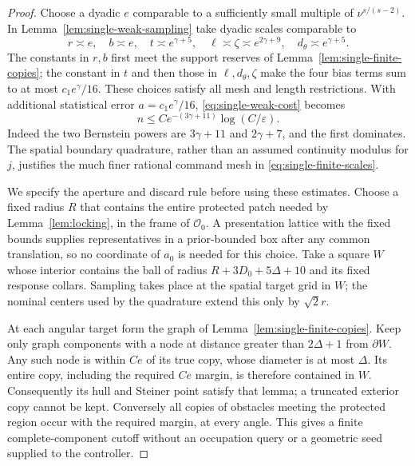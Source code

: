 \begin{proof}
Choose a dyadic $e$ comparable to a sufficiently small multiple of
$\nu^{s/(s-2)}$.  In Lemma~\ref{lem:single-weak-sampling} take dyadic
scales comparable to
\begin{equation}\label{eq:single-finite-scales}
 r\asymp e,\quad b\asymp e,\quad
 t\asymp e^{\gamma+5},\quad
 \ell\asymp\zeta\asymp e^{2\gamma+9},\quad
 d_\theta\asymp e^{\gamma+5}.
\end{equation}
The constants in $r,b$ first meet the support reserves of
Lemma~\ref{lem:single-finite-copies}; the constant in $t$ and then
those in $\ell,d_\theta,\zeta$ make the four bias terms sum to at
most $c_1e^\gamma/16$.  These choices satisfy all mesh and length
restrictions.  With additional statistical error
$a=c_1e^\gamma/16$, \eqref{eq:single-weak-cost} becomes
\begin{equation}\label{eq:single-per-target-count}
                  n\le C e^{-(3\gamma+11)}
                                   \log(C/\varepsilon).
\end{equation}
Indeed the two Bernstein powers are $3\gamma+11$ and $2\gamma+7$,
and the first dominates.  The spatial boundary quadrature, rather
than an assumed continuity modulus for $j$, justifies the much finer
rational command mesh in \eqref{eq:single-finite-scales}.

We specify the aperture and discard rule before using these estimates.
Choose a fixed radius $R$ that contains the entire protected patch
needed by Lemma~\ref{lem:locking}, in the frame of $\mathcal O_0$.
A presentation lattice with the fixed bounds supplies representatives
in a prior-bounded box after any common translation, so no coordinate
of $a_0$ is needed for this choice.  Take a square $W$ whose interior
contains the ball of radius
$R+3D_0+5\Delta+10$ and its fixed response collars.  Sampling takes
place at the spatial target grid in $W$; the nominal centers used by
the quadrature extend this only by $\sqrt2r$.

At each angular target form the graph of Lemma~\ref{lem:single-finite-copies}.
Keep only graph components with a node at distance greater than
$2\Delta+1$ from $\partial W$.  Any such node is within $Ce$ of its
true copy, whose diameter is at most $\Delta$.  Its entire copy,
including the required $Ce$ margin, is therefore contained in $W$.
Consequently its hull and Steiner point satisfy that lemma; a
truncated exterior copy cannot be kept.  Conversely all copies of
obstacles meeting the protected region occur with the required
margin, at every angle.  This gives a finite complete-component
cutoff without an occupation query or a geometric seed supplied to
the controller.


\end{proof}
